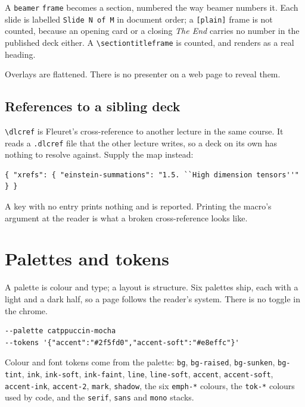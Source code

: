 \documentclass[11pt]{article}
\begin{document}
A \texttt{beamer} \texttt{frame} becomes a section, numbered the way beamer numbers
it. Each slide is labelled \texttt{Slide N of M} in document order; a
\texttt{[plain]} frame is not counted, because an opening card or a closing
\emph{The End} carries no number in the published deck either. A
\texttt{\textbackslash sectiontitleframe} is counted, and renders as a real heading.

Overlays are flattened. There is no presenter on a web page to reveal them.

\subsection{References to a sibling deck}

\texttt{\textbackslash dlcref} is Fleuret's cross-reference to another lecture in
the same course. It reads a \texttt{.dlcref} file that the other lecture writes,
so a deck on its own has nothing to resolve against. Supply the map instead:

\begin{verbatim}
{ "xrefs": { "einstein-summations": "1.5. ``High dimension tensors''" } }
\end{verbatim}
A key with no entry prints nothing and is reported. Printing the macro's
argument at the reader is what a broken cross-reference looks like.

\section{Palettes and tokens}

A palette is colour and type; a layout is structure. Six palettes ship, each
with a light and a dark half, so a page follows the reader's system. There is no
toggle
in the chrome.

\begin{verbatim}
--palette catppuccin-mocha
--tokens '{"accent":"#2f5fd0","accent-soft":"#e8effc"}'
\end{verbatim}

Colour and font tokens come from the palette: \texttt{bg}, \texttt{bg-raised},
\texttt{bg-sunken}, \texttt{bg-tint}, \texttt{ink}, \texttt{ink-soft},
\texttt{ink-faint}, \texttt{line}, \texttt{line-soft}, \texttt{accent},
\texttt{accent-soft}, \texttt{accent-ink}, \texttt{accent-2}, \texttt{mark},
\texttt{shadow}, the six \texttt{emph-*} colours, the \texttt{tok-*} colours used
by code, and the \texttt{serif}, \texttt{sans} and \texttt{mono} stacks.
\end{document}
